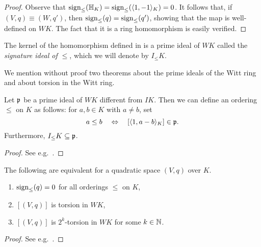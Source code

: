 \documentclass[12pt, leqno, british]{amsart}
\begin{document}
\begin{proof}
Observe that $\operatorname{sign}_\leq(\mathbb{H}_K) = \operatorname{sign}_\leq(\langle 1, -1 \rangle_K) = 0$.
It follows that, if $(V, q) \equiv (W, q')$, then $\operatorname{sign}_{\leq}(q) = \operatorname{sign}_\leq(q')$, showing that the map is well-defined on $WK$.
The fact that it is a ring homomorphism is easily verified.
\end{proof}
The kernel of the homomorphism defined in  is a prime ideal of $WK$ called the \emph{signature ideal of $\leq$}, which we will denote by $I_\leq K$.

We mention without proof two theorems about the prime ideals of the Witt ring and about torsion in the Witt ring.
\begin{thm}
Let $\mathfrak{p}$ be a prime ideal of $WK$ different from $IK$.
Then we can define an ordering $\leq$ on $K$ as follows: for $a, b \in K$ with $a \neq b$, set
$$ a \leq b \quad\Leftrightarrow\quad [\langle 1, a - b \rangle_K] \in \mathfrak{p}.$$
Furthermore, $I_{\leq}K \subseteq \mathfrak{p}$.
\end{thm}
\begin{proof}
See e.g.~\autocite[Theorem 31.24]{ElmanKarpenkoMerkurjev}.
\end{proof}
\begin{thm}\label{T:Pfisters-LGP}
The following are equivalent for a quadratic space $(V, q)$ over $K$.
\begin{enumerate}
\item $\operatorname{sign}_\leq(q) = 0$ for all orderings $\leq$ on $K$,
\item $[(V, q)]$ is torsion in $WK$,
\item $[(V, q)]$ is $2^k$-torsion in $WK$ for some $k \in \mathbb N$.
\end{enumerate}
\end{thm}
\begin{proof}
See e.g.~\autocite[Theorem VIII.3.2]{Lam}.
\end{proof}
\end{document}
